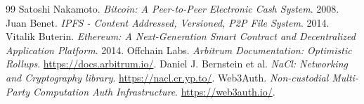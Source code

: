 \documentclass[12pt,a4paper]{report}
\begin{document}
\newpage
\begin{thebibliography}{99}
 Satoshi Nakamoto. \textit{Bitcoin: A Peer-to-Peer Electronic Cash System}. 2008.
 Juan Benet. \textit{IPFS - Content Addressed, Versioned, P2P File System}. 2014.
 Vitalik Buterin. \textit{Ethereum: A Next-Generation Smart Contract and Decentralized Application Platform}. 2014.
 Offchain Labs. \textit{Arbitrum Documentation: Optimistic Rollups}. \url{https://docs.arbitrum.io/}.
 Daniel J. Bernstein et al. \textit{NaCl: Networking and Cryptography library}. \url{https://nacl.cr.yp.to/}.
 Web3Auth. \textit{Non-custodial Multi-Party Computation Auth Infrastructure}. \url{https://web3auth.io/}.
\end{thebibliography}
\end{document}
